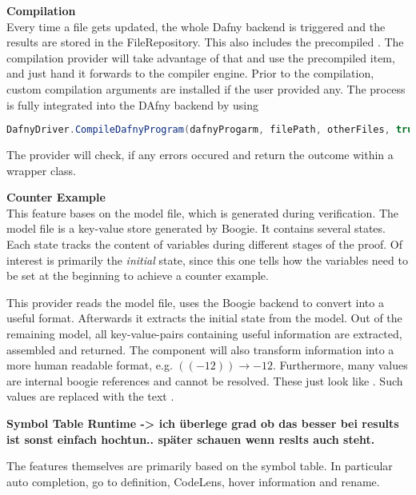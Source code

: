 \textbf{Compilation}\\
Every time a file gets updated, the whole Dafny backend is triggered and the results are stored in the FileRepository. This also includes the precompiled . The compilation provider will take advantage of that and use the precompiled item, and just hand it forwards to the compiler engine. Prior to the compilation, custom compilation arguments are installed if the user provided any. The process is fully integrated into the DAfny backend by using

\begin{lstlisting}[language=csharp, caption={Calling the Dafny Compiler}, captionpos=b, label={lst:dafnycompiler}]
DafnyDriver.CompileDafnyProgram(dafnyProgarm, filePath, otherFiles, true, textwriter);
\end{lstlisting}

The provider will check, if any errors occured and return the outcome within a wrapper class.

\textbf{Counter Example}\\
This feature bases on the model file, which is generated during verification. The model file is a key-value store generated by Boogie. It contains several states. Each state tracks the content of variables during different stages of the proof. Of interest is primarily the \textit{initial} state, since this one tells how the variables need to be set at the beginning to achieve a counter example.

This provider reads the model file, uses the Boogie backend to convert into a useful format. Afterwards it extracts the initial state from the model. Out of the remaining model, all key-value-pairs containing useful information are extracted, assembled and returned. The component will also transform information into a more human readable format, e.g. $((- 12)) \rightarrow -12$. Furthermore, many values are internal boogie references and cannot be resolved. These just look like . Such values are replaced with the text .











\textbf{Symbol Table Runtime -> ich überlege grad ob das besser bei results ist sonst einfach hochtun.. später schauen wenn reslts auch steht.}

The features themselves are primarily based on the symbol table.
In particular auto completion, go to definition, CodeLens, hover information and rename. \\


